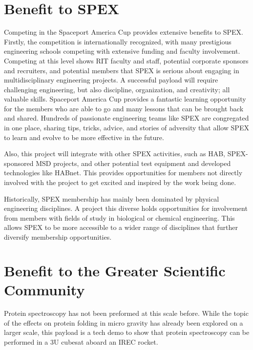 \documentclass[conference]{IEEEtran} %
\begin{document}
\section{Benefit to SPEX}
\label{sec:benefit-spex}

Competing in the Spaceport America Cup provides extensive benefits to SPEX. Firstly, the competition is internationally recognized, with many prestigious engineering schools competing with extensive funding and faculty involvement. Competing at this level shows RIT faculty and staff, potential corporate sponsors and recruiters, and potential members that SPEX is serious about engaging in multidisciplinary engineering projects. A successful payload will require challenging engineering, but also discipline, organization, and creativity; all valuable skills. Spaceport America Cup provides a fantastic learning opportunity for the members who are able to go and many lessons that can be brought back and shared. Hundreds of passionate engineering teams like SPEX are congregated in one place, sharing tips, tricks, advice, and stories of adversity that allow SPEX to learn and evolve to be more effective in the future.

Also, this project will integrate with other SPEX activities, such as HAB, SPEX-sponsored MSD projects, and other potential test equipment and developed technologies like HABnet. This provides opportunities for members not directly involved with the project to get excited and inspired by the work being done.

Historically, SPEX membership has mainly been dominated by physical engineering disciplines. A project this diverse holds opportunities for involvement from members with fields of study in biological or chemical engineering. This allows SPEX to be more accessible to a wider range of disciplines that further diversify membership opportunities.

\section{Benefit to the Greater Scientific Community}
\label{sec:benefit-sci}

Protein spectroscopy has not been preformed at this scale before. While the topic of the effects on protein folding in micro gravity has already been explored on a larger scale, this payload is a tech demo to show that protein spectroscopy can be performed in a 3U cubesat aboard an IREC rocket. 
\end{document}
